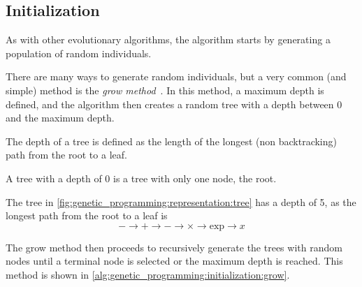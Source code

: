 \subsection{Initialization}
\label{sec:genetic_programming:initialization}
  As with other evolutionary algorithms, the algorithm starts by generating a
  population of random individuals.
  
  There are many ways to generate random individuals, but a very common (and
  simple) method is the \emph{grow 
  method}~\autocite{kozaGeneticProgrammingProgramming1992a}.
  In this method, a maximum depth is defined, and the algorithm then creates a
  random tree with a depth between 0 and the maximum depth.

  \begin{definition}
    The depth of a tree is defined as the length of the longest (non 
    backtracking) path from the root to a leaf.
  \end{definition}

  \begin{remark}
    A tree with a depth of 0 is a tree with only one node, the root.
  \end{remark}

  \begin{remark}
    The tree in \vref{fig:genetic_programming:representation:tree} has a depth
    of 5, as the longest path from the root to a leaf is 
    \[
      - \to + \to - \to \times \to \mathrm{exp} \to x
    \]
  \end{remark}

  The grow method then proceeds to recursively generate the trees with random
  nodes until a terminal node is selected or the maximum depth is reached.
  This method is shown in \vref{alg:genetic_programming:initialization:grow}.

